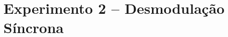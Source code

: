 \documentclass[12pt,addpoints]{exam}
\begin{document}
\begin{questions}
    

    
    
    
 

\end{questions}

\section*{Experimento 2 -- Desmodulação Síncrona}
\end{document}
